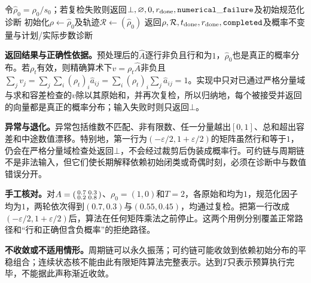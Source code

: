 \begin{AlgorithmContract}
\begin{algorithm}[H]
令$\widehat\rho_0=\rho_0/s_0$；若复检失败则返回$\bot,\varnothing,0,r_{\rm done},\mathtt{numerical\_failure}$及初始规范化诊断\;
初始化$\rho\leftarrow\widehat\rho_0$及轨迹$\mathcal R\leftarrow(\widehat\rho_0)$\;
返回$\rho,\mathcal R,t_{\rm done},r_{\rm done},\mathtt{completed}$及概率不变量与计划/实际步数诊断\;
\end{algorithm}
\end{AlgorithmContract}
\endgroup

\textbf{返回结果与正确性依据。}预处理后的$\widehat A$逐行非负且行和为$1$，$\widehat\rho_0$也是真正的概率分布。若$\rho_t$有效，则精确算术下$v=\rho_t\widehat A$非负且
$\sum_jv_j=\sum_j\sum_i(\rho_t)_i\widehat a_{ij}=\sum_i(\rho_t)_i\sum_j\widehat a_{ij}=1$。实现中只对已通过严格分量域与求和容差检查的$v$除以其原始和，并再次复检，所以归纳地，每个被接受并返回的向量都是真正的概率分布；输入失败时则只返回$\bot$。

\textbf{异常与退化。}异常包括维数不匹配、非有限数、任一分量越出$[0,1]$、总和超出容差和中途数值漂移。特别地，第一行为$(-\varepsilon/2,1+\varepsilon/2)$的矩阵虽然行和等于$1$，仍会在严格分量域检查处返回$\bot$，不会经过裁剪后伪装成概率行。可约链与周期链不是非法输入，但它们使长期解释依赖初始闭类或奇偶时刻，必须在诊断中与数值错误分开。

\textbf{手工核对。}对$A=\begin{psmallmatrix}0.7&0.3\\0.2&0.8\end{psmallmatrix}$、$\rho_0=(1,0)$和$T=2$，各原始和均为$1$，规范化因子均为$1$，两轮依次得到$(0.7,0.3)$与$(0.55,0.45)$，均通过复检。把第一行改成$(-\varepsilon/2,1+\varepsilon/2)$后，算法在任何矩阵乘法之前停止。这两个用例分别覆盖正常路径和“行和正确但含负概率”的拒绝路径。

\textbf{不收敛或不适用情形。}周期链可以永久振荡；可约链可能收敛到依赖初始分布的平稳组合；连续状态核不能由此有限矩阵算法完整表示。达到$T$只表示预算执行完毕，不能据此声称渐近收敛。

